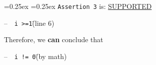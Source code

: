 \vfill
\begin{framed}
\topsep=0.25ex
\partopsep=0.25ex
\lstinline'Assertion 3' is: \underline{SUPPORTED}

\begin{tabbing}
--~~\= \lstinline'i >=1'\qquad\= (line 6)
\end{tabbing}
Therefore, we \textbf{can} conclude that
\begin{tabbing}
--~~\= \lstinline'i != 0'\qquad\= (by math)
\end{tabbing}

\end{framed}
